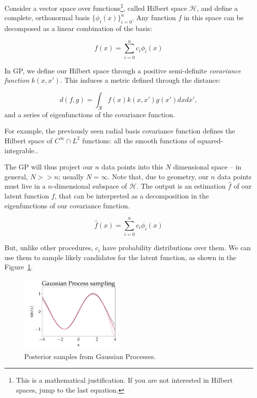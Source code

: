 Consider a vector space over functions\footnote{This is a mathematical justification. If you are not interested in Hilbert spaces, jump to the last equation.}, called Hilbert space $\mathscr{H}$, and define a complete, orthonormal basis $\{\phi_i(x)\}_{i=0}^{n}$.
Any function $f$ in this space can be decomposed as a linear combination of the basis:

 \[f(x) = \sum_{i=0}^{n} c_i \phi_i(x)\]
 
In GP, we define our Hilbert space through a positive semi-definite \emph{covariance function} $k(x, x')$.
This induces a metric defined through the distance:

	\[	d(f, g) =\int_{\mathcal{R}}  f(x) k(x, x') g(x') dx dx', \]
and a series of eigenfunctions of the covariance function.
	
For example, the previously seen radial basis covariance function defines the Hilbert space of $C^\infty \cap L^2$ functions: all the smooth functions of squared-integrable..
	
The GP will thus project our $n$ data points into this $N$ dimensional space -- in general, $N >> n$; usually $N = \infty$. Note that, due to geometry, our $n$ data points must live in a $n$-dimensional subspace of $\mathscr{H}$.
The output is an estimation $\hat f$ of our latent function $f$, that can be interpreted as a decomposition in the eigenfunctions of our covariance function.
	
	\[\hat f(x) = \sum_{i=0}^{n} c_i \phi_i(x)\]
	
But, unlike other procedures, $c_i$ have probability distributions over them.
We can use them to sample likely candidates for the latent function, as shown in the Figure~\ref{fig:gp_sampling}.
	
\begin{figure}[hbt]
\centering
	\includegraphics[width=0.45\textwidth]{machine_learning/figures/sin_samples}
	\caption{Posterior samples from Gaussian Processes.}\label{fig:gp_sampling}
\end{figure}

